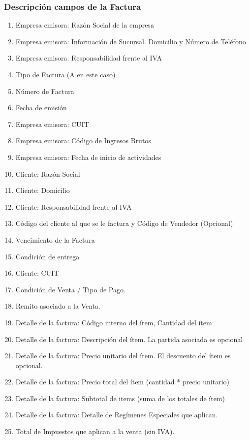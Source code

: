 \subsubsection{Descripci\'on campos de la Factura}
\begin{enumerate}
  \item Empresa emisora: Raz\'on Social de la empresa
  \item Empresa emisora: Informaci\'on de Sucursal. Domicilio y N\'umero de Tel\'efono
  \item Empresa emisora: Responsabilidad frente al IVA
  \item Tipo de Factura (A en este caso)
  \item N\'umero de Factura
  \item Fecha de emisi\'on
  \item Empresa emisora: CUIT
  \item Empresa emisora: C\'odigo de Ingresos Brutos
  \item Empresa emisora: Fecha de inicio de actividades
  \item Cliente: Raz\'on Social 
  \item Cliente: Domicilio
  \item Cliente: Responsabilidad frente al IVA
  \item C\'odigo del cliente al que se le factura y C\'odigo de Vendedor (Opcional)
  \item Vencimiento de la Factura
  \item Condici\'on de entrega
  \item Cliente: CUIT
  \item Condici\'on de Venta / Tipo de Pago.
  \item Remito asociado a la Venta.
  \item Detalle de la factura: C\'odigo interno del \'item, Cantidad del \'item
  \item Detalle de la factura: Descripci\'on del \'item. La partida asociada es opcional
  \item Detalle de la factura: Precio unitario del \'item. El descuento del \'item es opcional.
  \item Detalle de la factura: Precio total del \'item (cantidad * precio unitario)
  \item Detalle de la factura: Subtotal de items (suma de los totales de \'item)
  \item Detalle de la factura: Detalle de Reg\'imenes Especiales que aplican.
  \item Total de Impuestos que aplican a la venta (sin IVA).

\end{enumerate}
